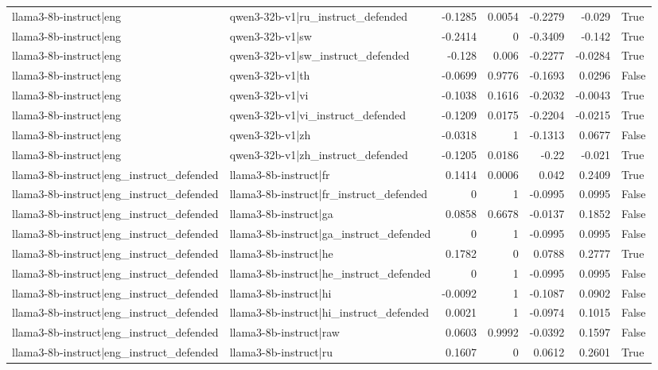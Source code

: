 \begin{table}
\begin{tabular}{l l r r r r l}
llama3-8b-instruct|eng & qwen3-32b-v1|ru_instruct_defended & -0.1285 & 0.0054 & -0.2279 & -0.029 & True \\
llama3-8b-instruct|eng & qwen3-32b-v1|sw & -0.2414 & 0 & -0.3409 & -0.142 & True \\
llama3-8b-instruct|eng & qwen3-32b-v1|sw_instruct_defended & -0.128 & 0.006 & -0.2277 & -0.0284 & True \\
llama3-8b-instruct|eng & qwen3-32b-v1|th & -0.0699 & 0.9776 & -0.1693 & 0.0296 & False \\
llama3-8b-instruct|eng & qwen3-32b-v1|vi & -0.1038 & 0.1616 & -0.2032 & -0.0043 & True \\
llama3-8b-instruct|eng & qwen3-32b-v1|vi_instruct_defended & -0.1209 & 0.0175 & -0.2204 & -0.0215 & True \\
llama3-8b-instruct|eng & qwen3-32b-v1|zh & -0.0318 & 1 & -0.1313 & 0.0677 & False \\
llama3-8b-instruct|eng & qwen3-32b-v1|zh_instruct_defended & -0.1205 & 0.0186 & -0.22 & -0.021 & True \\
llama3-8b-instruct|eng_instruct_defended & llama3-8b-instruct|fr & 0.1414 & 0.0006 & 0.042 & 0.2409 & True \\
llama3-8b-instruct|eng_instruct_defended & llama3-8b-instruct|fr_instruct_defended & 0 & 1 & -0.0995 & 0.0995 & False \\
llama3-8b-instruct|eng_instruct_defended & llama3-8b-instruct|ga & 0.0858 & 0.6678 & -0.0137 & 0.1852 & False \\
llama3-8b-instruct|eng_instruct_defended & llama3-8b-instruct|ga_instruct_defended & 0 & 1 & -0.0995 & 0.0995 & False \\
llama3-8b-instruct|eng_instruct_defended & llama3-8b-instruct|he & 0.1782 & 0 & 0.0788 & 0.2777 & True \\
llama3-8b-instruct|eng_instruct_defended & llama3-8b-instruct|he_instruct_defended & 0 & 1 & -0.0995 & 0.0995 & False \\
llama3-8b-instruct|eng_instruct_defended & llama3-8b-instruct|hi & -0.0092 & 1 & -0.1087 & 0.0902 & False \\
llama3-8b-instruct|eng_instruct_defended & llama3-8b-instruct|hi_instruct_defended & 0.0021 & 1 & -0.0974 & 0.1015 & False \\
llama3-8b-instruct|eng_instruct_defended & llama3-8b-instruct|raw & 0.0603 & 0.9992 & -0.0392 & 0.1597 & False \\
llama3-8b-instruct|eng_instruct_defended & llama3-8b-instruct|ru & 0.1607 & 0 & 0.0612 & 0.2601 & True \\

\end{tabular}
\end{table}
